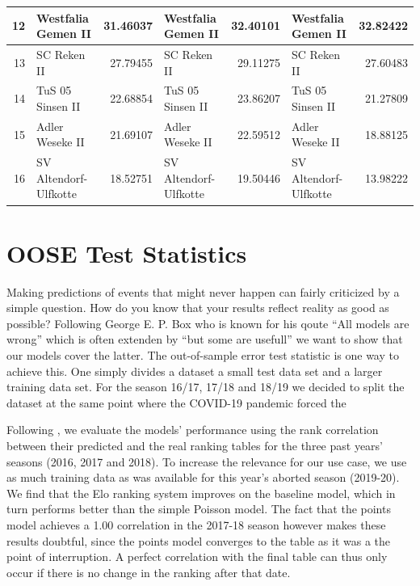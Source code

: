 \documentclass[12pt,a4paper]{article}
\begin{document}
\begin{table}[H]
{\begin{tabular}[t]{r|l|r|l|r|l|r}
\hline
12 & Westfalia Gemen II & 31.46037 & Westfalia Gemen II & 32.40101 & Westfalia Gemen II & 32.82422\\
\hline
\rowcolor{gray!6}  13 & SC Reken II & 27.79455 & SC Reken II & 29.11275 & SC Reken II & 27.60483\\
\hline
14 & TuS 05 Sinsen II & 22.68854 & TuS 05 Sinsen II & 23.86207 & TuS 05 Sinsen II & 21.27809\\
\hline
\rowcolor{gray!6}  15 & Adler Weseke II & 21.69107 & Adler Weseke II & 22.59512 & Adler Weseke II & 18.88125\\
\hline
16 & SV Altendorf-Ulfkotte & 18.52751 & SV Altendorf-Ulfkotte & 19.50446 & SV Altendorf-Ulfkotte & 13.98222\\
\hline
\end{tabular}}
\end{table}

\hypertarget{oose-test-statistics}{%
\section{OOSE Test Statistics}\label{oose-test-statistics}}

Making predictions of events that might never happen can fairly
criticized by a simple question. How do you know that your results
reflect reality as good as possible? Following George E. P. Box who is
known for his qoute \enquote{All models are wrong} which is often
extenden by \enquote{but some are usefull} we want to show that our
models cover the latter. The out-of-sample error test statistic is one
way to achieve this. One simply divides a dataset a small test data set
and a larger training data set. For the season 16/17, 17/18 and 18/19 we
decided to split the dataset at the same point where the COVID-19
pandemic forced the

Following \textcite{leitner2010}, we evaluate the models' performance
using the rank correlation between their predicted and the real ranking
tables for the three past years' seasons (2016, 2017 and 2018). To
increase the relevance for our use case, we use as much training data as
was available for this year's aborted season (2019-20). We find that the
Elo ranking system improves on the baseline model, which in turn
performs better than the simple Poisson model. The fact that the points
model achieves a 1.00 correlation in the 2017-18 season however makes
these results doubtful, since the points model converges to the table as
it was a the point of interruption. A perfect correlation with the final
table can thus only occur if there is no change in the ranking after
that date.
\end{document}

